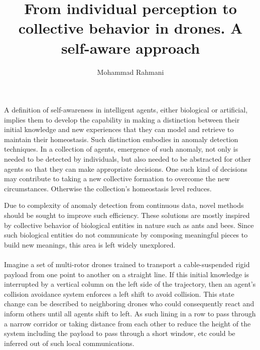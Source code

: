 \documentclass{article}
\begin{document}
	
	\title{From individual perception to collective behavior in drones. A self-aware approach}
	\author{Mohammad Rahmani}
	\date{}
	\maketitle
	
	\paragraph{} A definition of self-awareness in intelligent agents, either biological or artificial, implies them to develop the capability in making a distinction between their initial knowledge and new experiences that they can model and retrieve to maintain their homeostasis. Such distinction embodies in anomaly detection techniques. In a collection of agents, emergence of such anomaly, not only is needed to be detected by individuals, but also needed to be abstracted for other agents so that they can make appropriate decisions. One such kind of decisions may contribute to taking a new collective formation to overcome the new circumstances. Otherwise the collection's homeostasis level reduces. 
	
	Due to complexity of anomaly detection from continuous data, novel methods should be sought to improve such efficiency. These solutions are mostly inspired by collective behavior of biological entities in nature such as ants and bees. Since such biological entities do not communicate by composing meaningful pieces to build new meanings, this area is left widely unexplored.
	
	\paragraph{} Imagine a set of multi-rotor drones trained to transport a cable-suspended rigid payload from one point to another on a straight line. If this initial knowledge is interrupted by a vertical column on the left side of the trajectory, then an agent's collision avoidance system enforces a left shift to avoid collision. This state change can be described to neighboring drones who could consequently react and inform others until all agents shift to left. As such lining in a row to pass through a narrow corridor or taking distance from each other to reduce the height of the system including the payload to pass through a short window, etc could be inferred out of such local communications.
	
\end{document}
